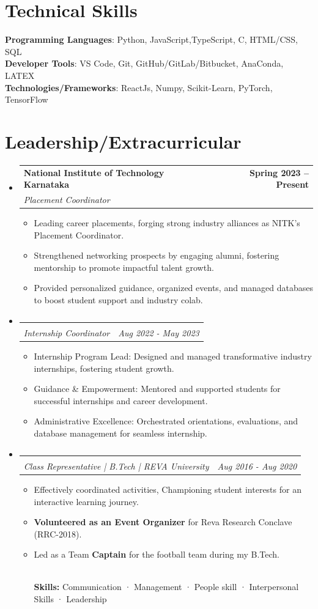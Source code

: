 \documentclass[letterpaper,8pt]{article}
\makeatletter
\newcommand{\resumeItem}[1]{
  \item\small{
    {#1 \vspace{-2pt}}
  }
}
\newcommand{\resumeSubheading}[4]{
  \vspace{-2pt}\item
    \begin{tabular*}{1.0\textwidth}[t]{l@{\extracolsep{\fill}}r}
      \textbf{#1} & \textbf{\small #2} \\
      \textit{\small#3} & \textit{\small #4} \\
    \end{tabular*}\vspace{-7pt}
}
\newcommand{\resumeSubHeadingListStart}{\begin{itemize}[leftmargin=0.0in, label={}]}
\newcommand{\resumeSubHeadingListEnd}{\end{itemize}}
\newcommand{\resumeItemListStart}{\begin{itemize}}
\newcommand{\resumeItemListEnd}{\end{itemize}\vspace{-5pt}}
\makeatother
\begin{document}
%
\section{Technical Skills}
 \begin{itemize}[leftmargin=0.15in, label={}]
    \small{\item{
     \textbf{Programming Languages}{: Python, JavaScript,TypeScript, C, HTML/CSS, SQL} \\
     \textbf{Developer Tools}{: VS Code, Git, GitHub/GitLab/Bitbucket, AnaConda, LATEX} \\
     \textbf{Technologies/Frameworks}{: ReactJs, Numpy, Scikit-Learn, PyTorch, TensorFlow } \\
    }}
 \end{itemize}


\section{Leadership/Extracurricular}
    \resumeSubHeadingListStart
        \resumeSubheading{National Institute of Technology Karnataka}{Spring 2023 -- Present}{Placement Coordinator}{}
            \resumeItemListStart
                \resumeItem{Leading career placements, forging strong industry alliances as NITK's Placement Coordinator.}
                \resumeItem{Strengthened networking prospects by engaging alumni, fostering mentorship to promote impactful talent growth.}
                \resumeItem{Provided personalized guidance, organized events, and managed databases to boost student support and industry colab.    }
            \resumeItemListEnd
    \resumeSubHeadingListEnd
    \resumeSubHeadingListStart
        \resumeSubheading{}{}{Internship Coordinator}{Aug 2022 - May 2023}
            \resumeItemListStart
                \resumeItem{Internship Program Lead: Designed and managed transformative industry internships, fostering student growth.}
                \resumeItem{Guidance \& Empowerment: Mentored and supported students for successful internships and career development.}
                \resumeItem{Administrative Excellence: Orchestrated orientations, evaluations, and database management for seamless internship.}
            \resumeItemListEnd
    \resumeSubHeadingListEnd
        \vspace{-30pt}
        \resumeSubHeadingListStart
        \resumeSubheading{}{}{Class Representative | B.Tech | REVA University}{Aug 2016 - Aug 2020}
            \resumeItemListStart
                \resumeItem{Effectively coordinated activities, Championing student interests for an interactive learning journey.  }
                \resumeItem{\textbf{Volunteered as an Event Organizer} for Reva Research Conclave (RRC-2018).}
                \resumeItem{Led as a Team \textbf{Captain} for the football team during my B.Tech.}
                \\
                \vspace{3pt}
                \textbf{Skills:} Communication  · Management  · People skill · Interpersonal Skills · Leadership
            \resumeItemListEnd
    \resumeSubHeadingListEnd
\end{document}
